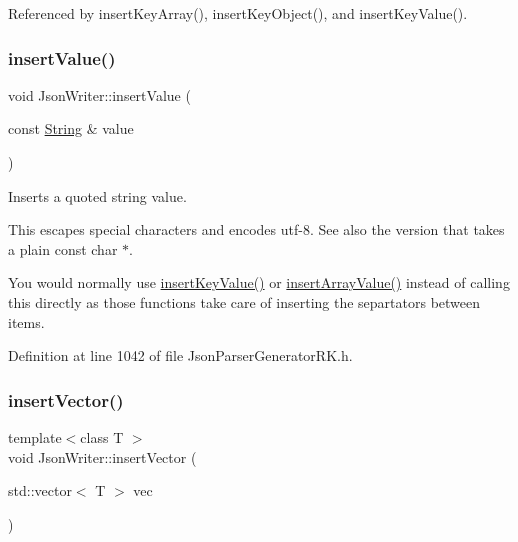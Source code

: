 Referenced by insert\+Key\+Array(), insert\+Key\+Object(), and insert\+Key\+Value().

\mbox{\label{class_json_writer_a6f8a280756ada908ab7e643f6dd1faa9}} 
\subsubsection{\texorpdfstring{insert\+Value()}{insertValue()}\hspace{0.1cm}{\footnotesize\ttfamily [9/9]}}
{\footnotesize\ttfamily void Json\+Writer\+::insert\+Value (\begin{DoxyParamCaption}\item[{const \hyperlink{class_string}{String} \&}]{value }\end{DoxyParamCaption})\hspace{0.3cm}{\ttfamily [inline]}}



Inserts a quoted string value. 

This escapes special characters and encodes utf-\/8. See also the version that takes a plain const char $\ast$.

You would normally use \hyperlink{class_json_writer_ac2de627389b59ce2c8ed95e10ea213bf}{insert\+Key\+Value()} or \hyperlink{class_json_writer_a8b4dc6726b66b4f277c7674e60c8a057}{insert\+Array\+Value()} instead of calling this directly as those functions take care of inserting the separtators between items. 

Definition at line 1042 of file Json\+Parser\+Generator\+R\+K.\+h.

\mbox{\label{class_json_writer_a6c1f223b7ef6538ef9135fe0a8b66aab}} 
\subsubsection{\texorpdfstring{insert\+Vector()}{insertVector()}}
{\footnotesize\ttfamily template$<$class T $>$ \\
void Json\+Writer\+::insert\+Vector (\begin{DoxyParamCaption}\item[{std\+::vector$<$ T $>$}]{vec }\end{DoxyParamCaption})\hspace{0.3cm}{\ttfamily [inline]}}



